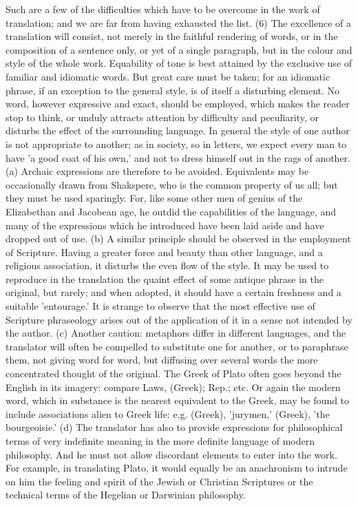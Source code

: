 \documentclass[11pt,letter]{article}
\begin{document}
\par  Such are a few of the difficulties which have to be overcome in the work of translation; and we are far from having exhausted the list. (6) The excellence of a translation will consist, not merely in the faithful rendering of words, or in the composition of a sentence only, or yet of a single paragraph, but in the colour and style of the whole work. Equability of tone is best attained by the exclusive use of familiar and idiomatic words. But great care must be taken; for an idiomatic phrase, if an exception to the general style, is of itself a disturbing element. No word, however expressive and exact, should be employed, which makes the reader stop to think, or unduly attracts attention by difficulty and peculiarity, or disturbs the effect of the surrounding language. In general the style of one author is not appropriate to another; as in society, so in letters, we expect every man to have 'a good coat of his own,' and not to dress himself out in the rags of another. (a) Archaic expressions are therefore to be avoided. Equivalents may be occasionally drawn from Shakspere, who is the common property of us all; but they must be used sparingly. For, like some other men of genius of the Elizabethan and Jacobean age, he outdid the capabilities of the language, and many of the expressions which he introduced have been laid aside and have dropped out of use. (b) A similar principle should be observed in the employment of Scripture. Having a greater force and beauty than other language, and a religious association, it disturbs the even flow of the style. It may be used to reproduce in the translation the quaint effect of some antique phrase in the original, but rarely; and when adopted, it should have a certain freshness and a suitable 'entourage.' It is strange to observe that the most effective use of Scripture phraseology arises out of the application of it in a sense not intended by the author. (c) Another caution: metaphors differ in different languages, and the translator will often be compelled to substitute one for another, or to paraphrase them, not giving word for word, but diffusing over several words the more concentrated thought of the original. The Greek of Plato often goes beyond the English in its imagery: compare Laws, (Greek); Rep.; etc. Or again the modern word, which in substance is the nearest equivalent to the Greek, may be found to include associations alien to Greek life: e.g. (Greek), 'jurymen,' (Greek), 'the bourgeoisie.' (d) The translator has also to provide expressions for philosophical terms of very indefinite meaning in the more definite language of modern philosophy. And he must not allow discordant elements to enter into the work. For example, in translating Plato, it would equally be an anachronism to intrude on him the feeling and spirit of the Jewish or Christian Scriptures or the technical terms of the Hegelian or Darwinian philosophy.
\end{document}
